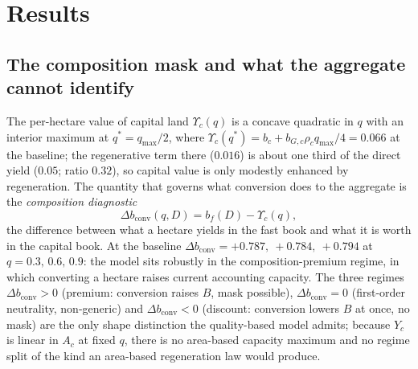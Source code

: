 \documentclass[preprint,12pt,authoryear]{elsarticle}
\newcommand{\dconv}{\Delta b_{\mathrm{conv}}}
\newcommand{\Ups}{\Upsilon_c}
\begin{document}
\section{Results}\label{sec:results}

\subsection{The composition mask and what the aggregate cannot identify}\label{sec:mask}

The per-hectare value of capital land $\Ups(q)$ is a concave quadratic in $q$ with an interior maximum at $q^*=q_{\max}/2$, where $\Ups(q^*)=b_c+b_{G,c}\rho_c q_{\max}/4=0.066$ at the baseline; the regenerative term there ($0.016$) is about one third of the direct yield ($0.05$; ratio $0.32$), so capital value is only modestly enhanced by regeneration. The quantity that governs what conversion does to the aggregate is the \emph{composition diagnostic}
\begin{equation}\label{eq:dconv}
\dconv(q,D)=b_f(D)-\Ups(q),
\end{equation}
the difference between what a hectare yields in the fast book and what it is worth in the capital book. At the baseline $\dconv=+0.787,\ +0.784,\ +0.794$ at $q=0.3,\,0.6,\,0.9$: the model sits robustly in the composition-premium regime, in which converting a hectare raises current accounting capacity. The three regimes $\dconv>0$ (premium: conversion raises $B$, mask possible), $\dconv=0$ (first-order neutrality, non-generic) and $\dconv<0$ (discount: conversion lowers $B$ at once, no mask) are the only shape distinction the quality-based model admits; because $Y_c$ is linear in $A_c$ at fixed $q$, there is no area-based capacity maximum and no regime split of the kind an area-based regeneration law would produce.
\end{document}
